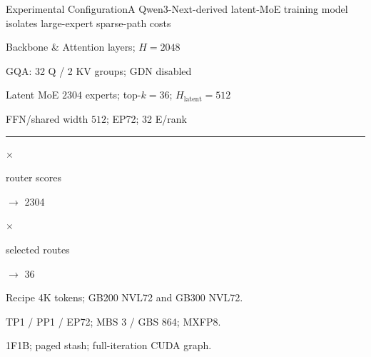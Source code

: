 \documentclass[aspectratio=169,10pt]{beamer}
\begin{document}
\begin{frame}{Experimental Configuration}{A Qwen3-Next-derived latent-MoE training model isolates large-expert sparse-path costs}
  \noindent
  \begin{minipage}[t]{.46\textwidth}
    {\NvidiaSansMedium Backbone \& Attention}\NvidiaTightRule[.28\linewidth]{.6pt}\vspace{.025in}
    \fontsize{8.5}{10} layers; $H=2048$\par\vspace{.02in}
    \fontsize{8.5}{10}\selectfont GQA: 32 Q / 2 KV groups; GDN disabled
  \end{minipage}
  \hfill
  \begin{minipage}[t]{.46\textwidth}
    {\NvidiaSansMedium Latent MoE}\NvidiaTightRule[.28\linewidth]{.6pt}\vspace{.025in}
    \fontsize{8.5}{10}\selectfont $2304$ experts; top-$k=36$; $H_{\mathrm{latent}}=512$\par\vspace{.02in}
    \fontsize{8.5}{10}\selectfont FFN/shared width $512$; EP72; 32 E/rank
  \end{minipage}
  \par\vspace{.07in}
  {\color{NvidiaRuleGray}\rule{\linewidth}{.4pt}}\par\vspace{.05in}
  \begin{minipage}[t]{.39\textwidth}
    \begin{minipage}[t]{.47\linewidth}
      {\fontsize{13}{15.5}\selectfont{}$\times$}\par
      \fontsize{8.5}{10}\selectfont router scores\par
      \fontsize{8}{9.5} $\rightarrow$ 2304
    \end{minipage}\hfill
    \begin{minipage}[t]{.47\linewidth}
      {\fontsize{13}{15.5}\selectfont{}$\times$}\par
      \fontsize{8.5}{10}\selectfont selected routes\par
      \fontsize{8}{9.5} $\rightarrow$ 36
    \end{minipage}
  \end{minipage}\hfill
  \begin{minipage}[t]{.55\textwidth}
    {\NvidiaSansMedium Recipe}\NvidiaTightRule[.28\linewidth]{.6pt}\vspace{.025in}
    \fontsize{8.5}{10}\selectfont 4K tokens; GB200 NVL72 and GB300 NVL72.\par\vspace{.02in}
    \fontsize{8.5}{10}\selectfont TP1 / PP1 / EP72; MBS 3 / GBS 864; MXFP8.\par\vspace{.02in}
    \fontsize{8.5}{10}\selectfont 1F1B; paged stash; full-iteration CUDA graph.
  \end{minipage}
\end{frame}
\end{document}
